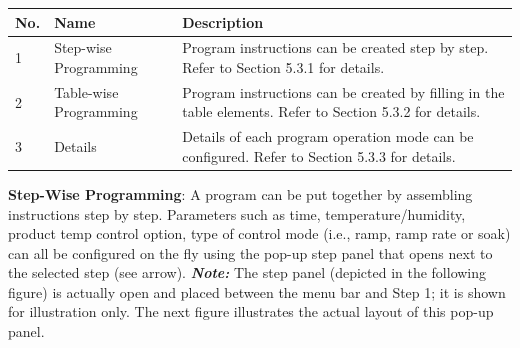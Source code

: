 \begin{longtable}[]{@{}|l|l|l|@{}}
\toprule
\rowcolor{brown}\begin{minipage}[b]{0.04\columnwidth}\raggedright
{\bf{No.}}\strut
\end{minipage} & \begin{minipage}[b]{0.23\columnwidth}\raggedright
{\bf{Name}}\strut
\end{minipage} & \begin{minipage}[b]{0.65\columnwidth}\raggedright
{\bf{Description}}\strut
\end{minipage}\tabularnewline
\midrule
\endhead
\begin{minipage}[t]{0.04\columnwidth}\raggedright
1\strut
\end{minipage} & \begin{minipage}[t]{0.23\columnwidth}\raggedright
Step-wise Programming\strut
\end{minipage} & \begin{minipage}[t]{0.65\columnwidth}\raggedright
Program instructions can be created step by step. Refer to Section 5.3.1
for details.\strut
\end{minipage}\tabularnewline
\begin{minipage}[t]{0.04\columnwidth}\raggedright
2\strut
\end{minipage} & \begin{minipage}[t]{0.23\columnwidth}\raggedright
Table-wise Programming\strut
\end{minipage} & \begin{minipage}[t]{0.65\columnwidth}\raggedright
Program instructions can be created by filling in the table elements.
Refer to Section 5.3.2 for details.\strut
\end{minipage}\tabularnewline
\begin{minipage}[t]{0.04\columnwidth}\raggedright
3\strut
\end{minipage} & \begin{minipage}[t]{0.23\columnwidth}\raggedright
Details\strut
\end{minipage} & \begin{minipage}[t]{0.65\columnwidth}\raggedright
Details of each program operation mode can be configured. Refer to
Section 5.3.3 for details.\strut
\end{minipage}\tabularnewline
\bottomrule
\end{longtable}

\textbf{Step-Wise Programming}: A program can be put together by
assembling instructions step by step. Parameters such as time,
temperature/humidity, product temp control option, type of control mode
(i.e., ramp, ramp rate or soak) can all be configured on the fly using
the pop-up step panel that opens next to the selected step (see arrow).
\textbf{\emph{Note:}} The step panel (depicted in the following figure)
is actually open and placed between the menu bar and Step 1; it is shown
for illustration only. The next figure illustrates the actual layout of
this pop-up panel.

